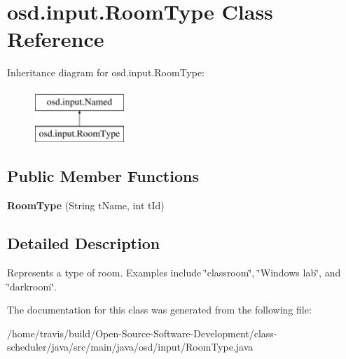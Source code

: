\hypertarget{interfaceosd_1_1input_1_1_room_type}{\section{osd.\-input.\-Room\-Type Class Reference}
\label{interfaceosd_1_1input_1_1_room_type}
}
Inheritance diagram for osd.\-input.\-Room\-Type\-:\begin{figure}[H]
\begin{center}
\leavevmode
\includegraphics[height=2.000000cm]{interfaceosd_1_1input_1_1_room_type}
\end{center}
\end{figure}
\subsection*{Public Member Functions}
\begin{DoxyCompactItemize}
\item 
\hypertarget{interfaceosd_1_1input_1_1_room_type_a1424e5b21be64ec53e15a86bd3881786}{{\bfseries Room\-Type} (String t\-Name, int t\-Id)}\label{interfaceosd_1_1input_1_1_room_type_a1424e5b21be64ec53e15a86bd3881786}

\end{DoxyCompactItemize}


\subsection{Detailed Description}
Represents a type of room. Examples include \char`\"{}classroom\char`\"{}, \char`\"{}\-Windows lab\char`\"{}, and \char`\"{}darkroom\char`\"{}. 

The documentation for this class was generated from the following file\-:\begin{DoxyCompactItemize}
\item 
/home/travis/build/\-Open-\/\-Source-\/\-Software-\/\-Development/class-\/scheduler/java/src/main/java/osd/input/Room\-Type.\-java\end{DoxyCompactItemize}
